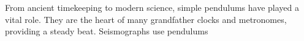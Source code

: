 \documentclass[preview]{standalone}
\begin{document}
\begin{center}
From ancient timekeeping to modern science, simple pendulums have played a vital role. They are the heart of many grandfather clocks and metronomes, providing a steady beat. Seismographs use pendulums
\end{center}
\end{document}

